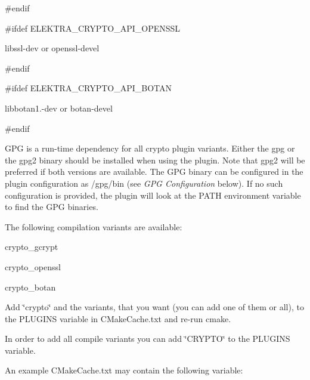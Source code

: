 \#endif

\#ifdef E\+L\+E\+K\+T\+R\+A\+\_\+\+C\+R\+Y\+P\+T\+O\+\_\+\+A\+P\+I\+\_\+\+O\+P\+E\+N\+S\+SL


\begin{DoxyItemize}
\item {\ttfamily libssl-\/dev} or {\ttfamily openssl-\/devel}
\end{DoxyItemize}

\#endif

\#ifdef E\+L\+E\+K\+T\+R\+A\+\_\+\+C\+R\+Y\+P\+T\+O\+\_\+\+A\+P\+I\+\_\+\+B\+O\+T\+AN


\begin{DoxyItemize}
\item {\ttfamily libbotan1.-\/dev} or {\ttfamily botan-\/devel}
\end{DoxyItemize}

\#endif

G\+PG is a run-\/time dependency for all crypto plugin variants. Either the {\ttfamily gpg} or the {\ttfamily gpg2} binary should be installed when using the plugin. Note that {\ttfamily gpg2} will be preferred if both versions are available. The G\+PG binary can be configured in the plugin configuration as {\ttfamily /gpg/bin} (see {\itshape G\+PG Configuration} below). If no such configuration is provided, the plugin will look at the P\+A\+TH environment variable to find the G\+PG binaries.

The following compilation variants are available\+:


\begin{DoxyEnumerate}
\item crypto\+\_\+gcrypt
\item crypto\+\_\+openssl
\item crypto\+\_\+botan
\end{DoxyEnumerate}

Add \char`\"{}crypto\char`\"{} and the variants, that you want (you can add one of them or all), to the {\ttfamily P\+L\+U\+G\+I\+NS} variable in {\ttfamily C\+Make\+Cache.\+txt} and re-\/run {\ttfamily cmake}.

In order to add all compile variants you can add \char`\"{}\+C\+R\+Y\+P\+T\+O\char`\"{} to the {\ttfamily P\+L\+U\+G\+I\+NS} variable.

An example {\ttfamily C\+Make\+Cache.\+txt} may contain the following variable\+:


\begin{DoxyCode}{0}
\end{DoxyCode}


